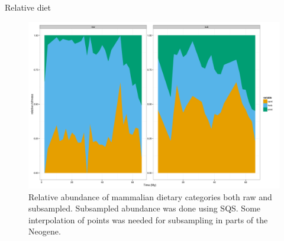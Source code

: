 \documentclass[final]{beamer}\usepackage[]{graphicx}\usepackage[]{color}
\newlength{\onecolwid}
\newlength{\twocolwid}
\begin{document}
\begin{frame}[t]
\begin{columns}[t]
\begin{column}{\twocolwid}
      \begin{columns}[t,totalwidth = \twocolwid]
        \begin{column}{\onecolwid}
          \begin{block}{Relative diet}
            \begin{figure}[ht]
              \centering
              \includegraphics[height = 0.2\textheight]{figure/facet_mix}
              \caption{Relative abundance of mammalian dietary categories both raw and subsampled. Subsampled abundance was done using SQS. Some interpolation of points was needed for subsampling in parts of the Neogene.}
              \label{fig:rel_ab}
            \end{figure}
          \end{block}
        \end{column}


\end{columns}
\end{column}
\end{columns}
\end{frame}
\end{document}
